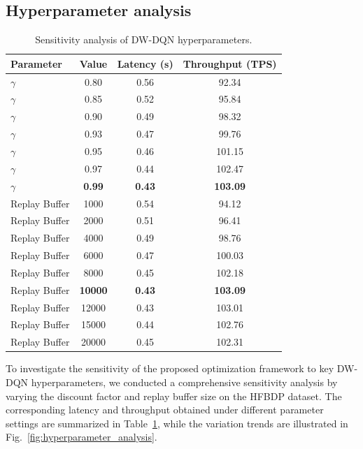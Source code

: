 \documentclass[a4paper,fleqn]{cas-dc}
\begin{document}
\subsection{Hyperparameter analysis}
\vspace{6pt}
\begin{table}[!htbp]
	\centering
	\caption{Sensitivity analysis of DW-DQN hyperparameters.}
	\label{tab:hyperparameter_analysis}
	\setlength{\tabcolsep}{6pt}
	\begin{tabular}{@{}lccc@{}}
		\toprule
		Parameter & Value & Latency (s) & Throughput (TPS) \\
		\midrule
		$\gamma$ & 0.80 & 0.56 & 92.34 \\
		$\gamma$ & 0.85 & 0.52 & 95.84 \\
		$\gamma$ & 0.90 & 0.49 & 98.32 \\
		$\gamma$ & 0.93 & 0.47 & 99.76 \\
		$\gamma$ & 0.95 & 0.46 & 101.15 \\
		$\gamma$ & 0.97 & 0.44 & 102.47 \\
		$\gamma$ & \textbf{0.99} & \textbf{0.43} & \textbf{103.09} \\
		\midrule
		Replay Buffer & 1000 & 0.54 & 94.12 \\
		Replay Buffer & 2000 & 0.51 & 96.41 \\
		Replay Buffer & 4000 & 0.49 & 98.76 \\
		Replay Buffer & 6000 & 0.47 & 100.03 \\
		Replay Buffer & 8000 & 0.45 & 102.18 \\
		Replay Buffer & \textbf{10000} & \textbf{0.43} & \textbf{103.09} \\
		Replay Buffer & 12000 & 0.43 & 103.01 \\
		Replay Buffer & 15000 & 0.44 & 102.76 \\
		Replay Buffer & 20000 & 0.45 & 102.31 \\
		\bottomrule
	\end{tabular}
\end{table}
To investigate the sensitivity of the proposed optimization framework to key DW-DQN hyperparameters, we conducted a comprehensive sensitivity analysis by varying the discount factor and replay buffer size on the HFBDP dataset. The corresponding latency and throughput obtained under different parameter settings are summarized in Table~\ref{tab:hyperparameter_analysis}, while the variation trends are illustrated in Fig.~\ref{fig:hyperparameter_analysis}.
\end{document}

